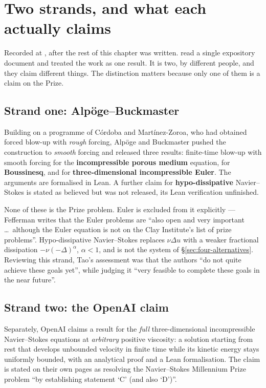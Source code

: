 \section{Two strands, and what each actually claims}
\label{sec:s49-two-strands}

Recorded at , after the rest of this chapter was written.  read
a single expository document and treated the work as one result. It is two,
by different people, and they claim different things. The distinction matters
because only one of them is a claim on the Prize.

\subsection*{Strand one: Alp\"oge--Buckmaster}

Building on a programme of C\'ordoba and Mart\'inez-Zoroa, who had obtained
forced blow-up with \emph{rough} forcing, Alp\"oge and Buckmaster pushed the
construction to \emph{smooth} forcing and released three results: finite-time
blow-up with smooth forcing for the \textbf{incompressible porous medium}
equation, for \textbf{Boussinesq}, and for \textbf{three-dimensional
incompressible Euler}. The arguments are formalised in Lean. A further claim
for \textbf{hypo-dissipative} Navier--Stokes is stated as believed but was
not released, its Lean verification unfinished.

None of these is the Prize problem. Euler is excluded from it explicitly ---
Fefferman writes that the Euler problems are ``also open and very
important \dots\ although the Euler equation is not on the Clay Institute's
list of prize problems''. Hypo-dissipative Navier--Stokes replaces
\(\nu\Delta u\) with a weaker fractional dissipation \(-\nu(-\Delta)^\alpha\),
\(\alpha<1\), and is not the system of \S\ref{sec:four-alternatives}.
Reviewing this strand, Tao's assessment was that the authors ``do not quite
achieve these goals yet'', while judging it ``very feasible to complete these
goals in the near future''.

\subsection*{Strand two: the OpenAI claim}

Separately, OpenAI claims a result for the \emph{full} three-dimensional
incompressible Navier--Stokes equations at \emph{arbitrary} positive
viscosity: a solution starting from rest that develops unbounded velocity in
finite time while its kinetic energy stays uniformly bounded, with an
analytical proof and a Lean formalisation. The claim is stated on their own
pages as resolving the Navier--Stokes Millennium Prize problem ``by
establishing statement `C' (and also `D')''.

